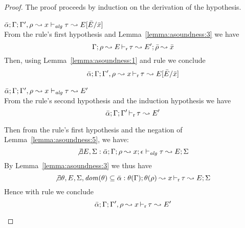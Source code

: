 \begin{proof}
The proof proceeds by induction on the derivation of the hypothesis.
\begin{description}
\setlength{\itemsep}{1em}
\item[\fbox{\texttt{(Alg-L-RuleMatch)}}]\quad$\bar{\alpha};\Gamma; \Gamma', \rho~{\leadsto x} \vdash_{\mathit{alg}} \tau~{\leadsto E[\bar{E}/\bar{x}]}$ \ \\
From the rule's first hypothesis and Lemma~\ref{lemma:asoundness:3} we have
\begin{equation*}
\Gamma; \rho \leadsto E \mathop{\vdash_{\mathrm{r}}} \tau \leadsto E'; \bar{\rho} \leadsto \bar{x}
\end{equation*}
Then, using Lemma~\ref{lemma:asoundness:1} and rule  we conclude
\begin{equation*}
\bar{\alpha};\Gamma; \Gamma', \rho~{\leadsto x} \mathop{\vdash_{\mathrm{r}}} \tau~{\leadsto E[\bar{E}/\bar{x}]}
\end{equation*}

\item[\fbox{\texttt{(Alg-L-RuleNoMatch)}}]\quad$\bar{\alpha};\Gamma;\Gamma', \rho~{\leadsto x}\vdash_{\mathit{alg}} \tau~{\leadsto E'}$ \ \\
  From the rule's second hypothesis and the induction hypothesis we have
\begin{equation*}
  \bar{\alpha};\Gamma;\Gamma' \mathop{\vdash_{\mathrm{r}}} \tau~{\leadsto E'}
\end{equation*}

  Then from the rule's first hypothesis and the negation of Lemma~\ref{lemma:asoundness:5}, we have:
\begin{equation*}
\not\exists E, \Sigma: \bar{\alpha};\Gamma;\rho \leadsto x; \epsilon \vdash_{\mathit{alg}} \tau \leadsto E; \Sigma
\end{equation*}
  By Lemma~\ref{lemma:asoundness:3} we thus have
\begin{equation*}
\not\exists \theta, E, \Sigma, \mathit{dom}(\theta) \subseteq \bar{\alpha}: \theta(\Gamma);\theta(\rho) \leadsto x \mathop{\vdash_{\mathrm{r}}} \tau \leadsto E; \Sigma
\end{equation*}
  Hence with rule  we conclude
\begin{equation*}
  \bar{\alpha};\Gamma;\Gamma',\rho \leadsto x \mathop{\vdash_{\mathrm{r}}} \tau~{\leadsto E'}
\end{equation*}


\end{description}
\end{proof}
